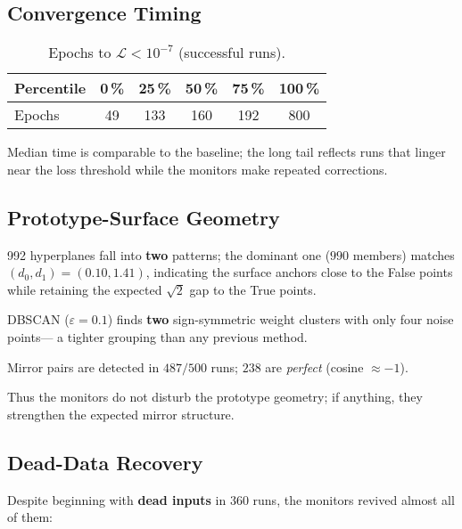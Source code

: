 \subsection*{Convergence Timing}

\begin{table}[h]
\centering
\caption{Epochs to $\mathcal L<10^{-7}$ (successful runs).}
\label{tab:relu1-monitor-epochs}
\begin{tabular}{lccccc}
\toprule
Percentile & 0\,\% & 25\,\% & 50\,\% & 75\,\% & 100\,\% \\ \midrule
Epochs & 49 & 133 & 160 & 192 & 800 \\
\bottomrule
\end{tabular}
\end{table}

Median time is comparable to the baseline; the long tail reflects runs
that linger near the loss threshold while the monitors make repeated
corrections.

\subsection*{Prototype-Surface Geometry}

\begin{description}[leftmargin=2em]
  \item[Distance clusters]
        992 hyperplanes fall into \textbf{two} patterns; the dominant
        one ($990$ members) matches $(d_{0},d_{1})\!=\!(0.10,1.41)$,
        indicating the surface anchors close to the False points while
        retaining the expected $\sqrt2$ gap to the True points.
  \item[Weight clusters]
        DBSCAN ($\varepsilon=0.1$) finds \textbf{two} sign-symmetric
        weight clusters with only four noise points—
        a tighter grouping than any previous method.
  \item[Mirror symmetry]
        Mirror pairs are detected in $487/500$ runs; $238$ are
        \emph{perfect} (cosine $\approx-1$).
\end{description}

Thus the monitors do not disturb the prototype geometry; if anything,
they strengthen the expected mirror structure.

\subsection*{Dead-Data Recovery}
Despite beginning with \textbf{dead inputs} in 360 runs, the monitors
revived almost all of them:

